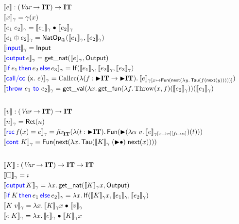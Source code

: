 \begin{figure}
  \begin{align*}
    &\sem{\expr} \col (\Var \rightarrow \IT) \rightarrow \IT \\
    &\sem{\var}_\gamma = \gamma(\var) \\
    &\sem{\eapp{\expr_1}{\expr_2}}_\gamma = \APPs{\sem{\expr_1}_\gamma}{\sem{\expr_2}_\gamma} \\
    &\sem{\natop{\expr_1}{\expr_2}}_\gamma = \NATOP_{\oplus}(\sem{\expr_1}_\gamma, \sem{\expr_2}_\gamma)\\
    &\sem{\Input}_\gamma = \INPUT \\
    &\sem{\Output e}_\gamma = \getnat(\sem{e}_\gamma, \OUTPUT) \\
    &\sem{\If \expr_1 then \expr_2 \Else \expr_3}_\gamma = \IF(\sem{\expr_1}_\gamma, \sem{\expr_2}_\gamma, \sem{\expr_3}_\gamma) \\
    &\sem{\callcc{\var}{\expr}}_{\gamma} = \callccGT(\Lam (f \col \latert \IT \rightarrow \latert \IT). \sem{\expr}_{\gamma[\var \mapsto \Fun (\Next (\Lam y. \Tau (f (\Next (y)))))]}) \\
    &\sem{\throw{\expr_1}{\expr_2}}_{\gamma} = \getval (\Lam x. \getfun (\Lam f. \throwGT(x, f) (\sem{\expr_2}_\gamma)) (\sem{\expr_1}_\gamma)\\
    \intertext{}
    &\sem{\val} \col (\Var \rightarrow \IT) \rightarrow \IT \\
    &\sem{n}_\gamma = \Rret(n) \\
    &\sem{\Rec f \var = \expr}_\gamma = \fix_{\IT}(\Lam (t \col \latert \IT).
      \Fun(\latert (\Lam \alpha\ v. \sem{\expr}_{\gamma[\var \mapsto v][f \mapsto \alpha]})(t)))\\
    &\sem{\cont K}_\gamma = \Fun(\Next(\Lam x. \Tau(\APPsl{\sem{K}_\gamma}{\Next(x)})))\\
    \intertext{}
    &\sem{K} \col (\Var \rightarrow \IT) \rightarrow \IT \rightarrow \IT \\
    &\sem{\emptyK}_\gamma = \imath \\
    &\sem{\Output K}_\gamma = \Lam x. \getnat(\sem{K}_\gamma x, \OUTPUT) \\
    &\sem{\If K then \expr_1 \Else \expr_2}_\gamma = \Lam x. \IF(\sem{K}_\gamma x, \sem{\expr_1}_\gamma, \sem{\expr_2}_\gamma) \\
    &\sem{\eapp{K}{\val}}_\gamma = \Lam x. \APPs{\sem{K}_\gamma x}{\sem{\val}_\gamma} \\
    &\sem{\eapp{\expr}{K}}_\gamma = \Lam x. \APPs{\sem{\expr}_\gamma}{\sem{K}_\gamma x} \\

\end{align*}
\end{figure}
